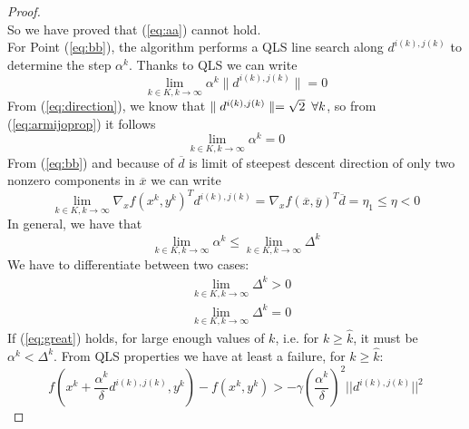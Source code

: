\begin{proof}
\begin{equation}
\end{equation}
So we have proved that (\ref{eq:aa}) cannot hold.\\
For Point (\ref{eq:bb}), the algorithm performs a QLS line search along $d^{i(k),j(k)}$ to determine the step $\alpha^{k}$. Thanks to QLS we can write
\begin{equation}\label{eq:armijoprop}
\lim_{k \in K, k \rightarrow \infty} \alpha^{k} \parallel d^{i(k),j(k)} \parallel = 0
\end{equation}
From (\ref{eq:direction}), we know that $\parallel d^{i(k),j(k)} \parallel = \sqrt{2} \enskip\forall k$, so from (\ref{eq:armijoprop}) it follows
\begin{equation}\label{eq:alpha}%
\lim_{k \in K, k \rightarrow \infty} \alpha^{k}=0
\end{equation}
From (\ref{eq:bb}) and because of $\overline{d}$ is limit of steepest descent direction of only two nonzero components in $\overline{x}$ we can write
\begin{equation}\label{eq:wrong}
\lim_{k \in K, k \rightarrow \infty} \nabla_x f(x^k, y^k)^T d^{i(k),j(k)} = \nabla_x f(\overline{x},\overline{y})^T \overline{d} = \eta_1 \le \eta < 0
\end{equation}
In general, we have that
\begin{equation}
\lim_{k \in K, k \rightarrow \infty} \alpha^k \leq \lim_{k \in K, k \rightarrow \infty} \Delta^k
\end{equation}
We have to differentiate between two cases:
\begin{subequations}
\begin{align}
& \lim_{k \in K, k \rightarrow \infty} \Delta^k > 0 \label{eq:great}\\
& \lim_{k \in K, k \rightarrow \infty} \Delta^k = 0 \label{eq:zero}
\end{align}
\end{subequations}
If (\ref{eq:great}) holds, for large enough values of $k$, i.e. for $k \geq \hat{k}$, it must be $\alpha^k < \Delta^k$. From QLS properties we have at least a failure, for $k \geq \hat{k}$:
\begin{equation}\label{eq:arm1}
f(x^k + \frac{\alpha^k}{\delta} d^{i(k),j(k)}, y^k) - f(x^k,y^k) > -\gamma \left(\frac{\alpha^k}{\delta}\right)^2 ||d^{i(k),j(k)}||^2

\end{equation}
\end{proof}
